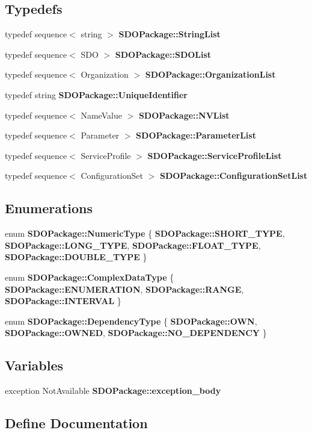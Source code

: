 \subsection*{Typedefs}
\begin{DoxyCompactItemize}
\item 
typedef sequence$<$ string $>$ {\bf SDOPackage::StringList}
\item 
typedef sequence$<$ SDO $>$ {\bf SDOPackage::SDOList}
\item 
typedef sequence$<$ Organization $>$ {\bf SDOPackage::OrganizationList}
\item 
typedef string {\bf SDOPackage::UniqueIdentifier}
\item 
typedef sequence$<$ NameValue $>$ {\bf SDOPackage::NVList}
\item 
typedef sequence$<$ Parameter $>$ {\bf SDOPackage::ParameterList}
\item 
typedef sequence$<$ ServiceProfile $>$ {\bf SDOPackage::ServiceProfileList}
\item 
typedef sequence$<$ ConfigurationSet $>$ {\bf SDOPackage::ConfigurationSetList}
\end{DoxyCompactItemize}
\subsection*{Enumerations}
\begin{DoxyCompactItemize}
\item 
enum {\bf SDOPackage::NumericType} \{ {\bf SDOPackage::SHORT\_\-TYPE}, 
{\bf SDOPackage::LONG\_\-TYPE}, 
{\bf SDOPackage::FLOAT\_\-TYPE}, 
{\bf SDOPackage::DOUBLE\_\-TYPE}
 \}
\item 
enum {\bf SDOPackage::ComplexDataType} \{ {\bf SDOPackage::ENUMERATION}, 
{\bf SDOPackage::RANGE}, 
{\bf SDOPackage::INTERVAL}
 \}
\item 
enum {\bf SDOPackage::DependencyType} \{ {\bf SDOPackage::OWN}, 
{\bf SDOPackage::OWNED}, 
{\bf SDOPackage::NO\_\-DEPENDENCY}
 \}
\end{DoxyCompactItemize}
\subsection*{Variables}
\begin{DoxyCompactItemize}
\item 
exception NotAvailable {\bf SDOPackage::exception\_\-body}
\end{DoxyCompactItemize}


\subsection{Define Documentation}
